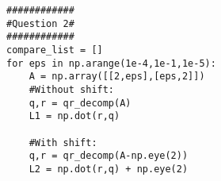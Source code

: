 \documentclass[10pt,a4paper]{article}
\begin{document}
\begin{verbatim}
############                                                                                                                                                                               
#Question 2#                                                                                                                                                                               
############                                                                                                                                                                               
compare_list = []                                                                                                                                                                          
for eps in np.arange(1e-4,1e-1,1e-5):                                                                                                                                                      
    A = np.array([[2,eps],[eps,2]])                                                                                                                                                        
    #Without shift:                                                                                                                                                                        
    q,r = qr_decomp(A)                                                                                                                                                                     
    L1 = np.dot(r,q)                                                                                                                                                                       
                                                                                                                                                                                           
    #With shift:                                                                                                                                                                           
    q,r = qr_decomp(A-np.eye(2))                                                                                                                                                           
    L2 = np.dot(r,q) + np.eye(2)                                                                                                                                                           
                                                                                                                                                                                           

\end{verbatim}
\end{document}
